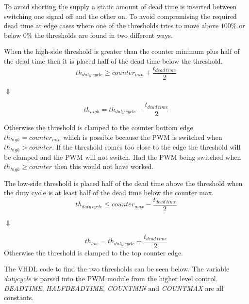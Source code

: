 To avoid shorting the supply a static amount of dead time is inserted between switching one signal off and the other on.
To avoid compromising the required dead time at edge cases where one of the thresholds tries to move above $100 \%$ or  below $0 \%$ the thresholds are found in two different ways.

When the high-side threshold is greater than the counter minimum plus half of the dead time then it is placed half of the dead time below the threshold.
\begin{equation}
    th_{duty \ cycle} \geq  counter_{min} + \frac{t_{dead \ time}}{2}
\end{equation}
\begin{center}
    $\Downarrow$    
\end{center}
\begin{equation}
   th_{high} = th_{duty \ cycle} - \frac{t_{dead \ time}}{2}  
\end{equation}

Otherwise the threshold is clamped to the counter bottom edge $th_{high} = counter_{min}$ which is possible because the PWM is switched when $th_{high} > counter$.
If the threshold comes too close to the edge the threshold will be clamped and the PWM will not switch. Had the PWM being switched when $th_{high} \geq counter$ then this would not have worked.



The low-side threshold is placed half of the dead time above the threshold when the duty cycle is at least half of the dead time below the counter max.
\begin{equation}
    th_{duty \ cycle}\leq counter_{max} - \frac{t_{dead \ time}}{2}
\end{equation}
\begin{center}
    $\Downarrow$
\end{center}
\begin{equation}
  th_{low} = th_{duty \ cycle} + \frac{t_{dead \ time}}{2}  
\end{equation}
Otherwise the threshold is clamped to the top counter edge.

The VHDL code to find the two thresholds can be seen below. The variable \textit{duty\textunderscore cycle} is parsed into the PWM module from the higher level control. \textit{DEADTIME}, \textit{HALF\textunderscore DEADTIME}, \textit{COUNT\textunderscore MIN} and \textit{COUNT\textunderscore MAX} are all constants.

